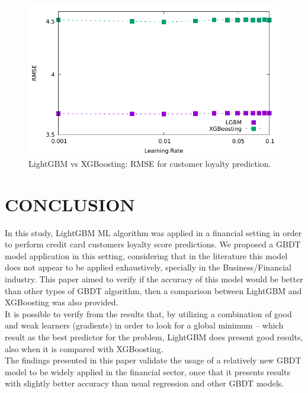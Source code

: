 \documentclass[letterpaper, 10 pt, conference]{ieeeconf}  %
\begin{document}
\begin{figure}[thpb]
\centering
\includegraphics[scale=0.7]{Figures/learningrate_rmse_lgbm2.pdf}
\caption{LightGBM vs XGBoosting: RMSE for customer loyalty prediction.}
\label{Xboosting}
\end{figure}


\section{CONCLUSION}
In this study, LightGBM ML algorithm was applied in a financial setting in order to perform credit card customers loyalty score predictions. We proposed a GBDT model application in this setting, considering that in the literature this model does not appear to be applied exhaustively, specially in the Business/Financial industry. This paper aimed to verify if the accuracy of this model would be better than other types of GBDT algorithm, then a comparison between LightGBM and XGBoosting was also provided.\\

It is possible to verify from the results that, by utilizing a combination of good and weak learners (gradients) in order to look for a global minimum -- which result as the best predictor for the problem, LightGBM does present good results, also when it is compared with XGBoosting.\\

The findings presented in this paper validate the usage of a relatively new GBDT model to be widely applied in the financial sector, once that it presents results with slightly better accuracy than usual regression and other GBDT models.\\
\end{document}
